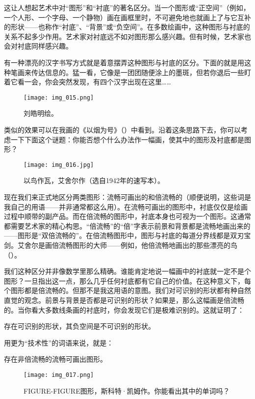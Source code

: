 这让人想起艺术中对“图形”和“衬底”的著名区分。当一个图形或“正空间”（例如，一个人形、一个字母、一个静物）画在画框里时，不可避免地也就画上了与它互补的形状——也称作“衬底”、“背景”或“负空间”。在多数绘画中，这种图形与衬底的关系不起多少作用。艺术家对衬底远不如对图形那么感兴趣。但有时候，艺术家也会对衬底同样感兴趣。

有一种漂亮的汉字书写方式就是着意摆弄这种图形与衬底的区分。下面的就是用这种笔画来传达信息的。猛一看，它像是一团团随便涂上的墨斑，但若你退后一些盯着它看一会，你会突然发现，有四个汉字出现在这里……

\begin{figure}
\texttt{[image: img\_015.png]}
\caption[“以子之矛”。]
  {刘皓明绘。}
\end{figure}

类似的效果可以在我画的《以烟为号》（）中看到。沿着这条思路下去，你可以考虑一下下面这个谜题：你能否想个什么办法作一幅画，使其中的图形及衬底都是图形？

\begin{figure}
\texttt{[image: img\_016.jpg]}
\caption[以鸟作瓦，艾舍尔作。]
  {以鸟作瓦，艾舍尔作（选自1942年的速写本）。}
\end{figure}

现在我们来正式地区分两类图形：流畅可画出的和倍流畅的（顺便说明，这些词是我自己的用语——并非通常都这么用）。在流畅可画出的图形中，衬底仅仅是绘画过程中顺带的副产品。而在倍流畅的图形中，衬底本身也可视为一个图形。这通常都需要艺术家的精心构思。“倍流畅”的“倍”字表示前景和背景都是流畅地画出来的——图形是“双倍流畅的”。在倍流畅图形中，图形与衬底的每道分界线都是双刃宝剑。艾舍尔是画倍流畅图形的大师——例如，他倍流畅地画出的那些漂亮的鸟（）。

我们这种区分并非像数学里那么精确。谁能肯定地说一幅画中的衬底就一定不是个图形？一旦指出这一点，那么几乎任何衬底都有它自己的价值。在这种意义下，每个图形都是倍流畅的。但那不是我这用语的意图。我们对可识别的形状都有种自然直觉的观念。前景与背景是否都是可识别的形状？如果是，那么这幅画是倍流畅的。当你看大多数线条画的衬底时，你会发现它们是极难识别的。这就证明了：

\begin{block}
存在可识别的形状，其负空间是不可识别的形状。
\end{block}

用更为“技术性”的词语来说，就是：

\begin{block}
存在非倍流畅的流畅可画出图形。
\end{block}

\begin{figure}
\texttt{[image: img\_017.png]}
\caption[FIGURE-FIGURE图形，斯科特·凯姆作。]
  {FIGURE-FIGURE图形，斯科特·凯姆作。你能看出其中的单词吗？}
\end{figure}

